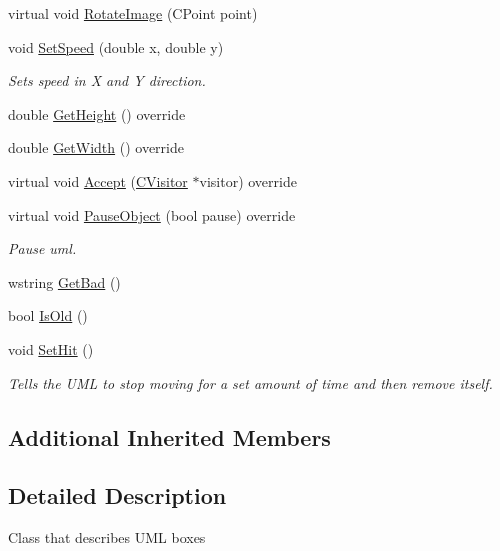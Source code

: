 \begin{DoxyCompactItemize}
virtual void \mbox{\hyperlink{class_c_uml_box_aabcb2f2f611d6a99c0f71815ae4a1971}{Rotate\+Image}} (C\+Point point)
\item 
\mbox{\label{class_c_uml_box_ad31feeb00c2b3b458dee9da1d752d1af}} 
void \mbox{\hyperlink{class_c_uml_box_ad31feeb00c2b3b458dee9da1d752d1af}{Set\+Speed}} (double x, double y)
\begin{DoxyCompactList}\small\item\em Sets speed in X and Y direction. \end{DoxyCompactList}\item 
double \mbox{\hyperlink{class_c_uml_box_a41f93630b86229a23274b14b7308b1f8}{Get\+Height}} () override
\item 
double \mbox{\hyperlink{class_c_uml_box_a511859ee5042e1af916947bd22c5c18a}{Get\+Width}} () override
\item 
virtual void \mbox{\hyperlink{class_c_uml_box_a492e1d6063c938e7f099fe5640fc669b}{Accept}} (\mbox{\hyperlink{class_c_visitor}{C\+Visitor}} $\ast$visitor) override
\item 
virtual void \mbox{\hyperlink{class_c_uml_box_a49ddda6a0bbd7b224b743f83b2f7cb0c}{Pause\+Object}} (bool pause) override
\begin{DoxyCompactList}\small\item\em Pause uml. \end{DoxyCompactList}\item 
wstring \mbox{\hyperlink{class_c_uml_box_a4d51ebc9a812ac80909102be243eb3b8}{Get\+Bad}} ()
\item 
bool \mbox{\hyperlink{class_c_uml_box_a5b47b46b1908f3c6adc06978ff88f148}{Is\+Old}} ()
\item 
\mbox{\label{class_c_uml_box_a6930e3fcccd1afb4ba0e335911c859c2}} 
void \mbox{\hyperlink{class_c_uml_box_a6930e3fcccd1afb4ba0e335911c859c2}{Set\+Hit}} ()
\begin{DoxyCompactList}\small\item\em Tells the U\+ML to stop moving for a set amount of time and then remove itself. \end{DoxyCompactList}\end{DoxyCompactItemize}
\subsection*{Additional Inherited Members}


\subsection{Detailed Description}
Class that describes U\+ML boxes 

